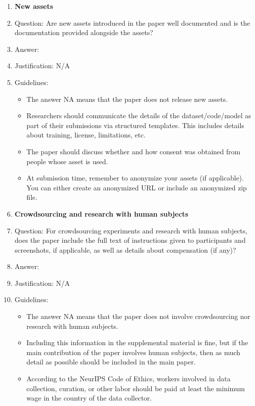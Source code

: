 \documentclass{article}
\begin{document}
\begin{enumerate}
\item {\bf New assets}
    \item[] Question: Are new assets introduced in the paper well documented and is the documentation provided alongside the assets?
    \item[] Answer: \answerNA{} %
    \item[] Justification: N/A
    \item[] Guidelines:
    \begin{itemize}
        \item The answer NA means that the paper does not release new assets.
        \item Researchers should communicate the details of the dataset/code/model as part of their submissions via structured templates. This includes details about training, license, limitations, etc. 
        \item The paper should discuss whether and how consent was obtained from people whose asset is used.
        \item At submission time, remember to anonymize your assets (if applicable). You can either create an anonymized URL or include an anonymized zip file.
    \end{itemize}

\item {\bf Crowdsourcing and research with human subjects}
    \item[] Question: For crowdsourcing experiments and research with human subjects, does the paper include the full text of instructions given to participants and screenshots, if applicable, as well as details about compensation (if any)? 
    \item[] Answer: \answerNA{} %
    \item[] Justification: N/A
    \item[] Guidelines:
    \begin{itemize}
        \item The answer NA means that the paper does not involve crowdsourcing nor research with human subjects.
        \item Including this information in the supplemental material is fine, but if the main contribution of the paper involves human subjects, then as much detail as possible should be included in the main paper. 
        \item According to the NeurIPS Code of Ethics, workers involved in data collection, curation, or other labor should be paid at least the minimum wage in the country of the data collector. 
    \end{itemize}


\end{enumerate}
\end{document}
